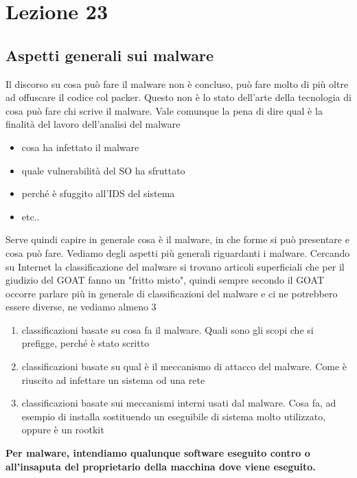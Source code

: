 \documentclass[12pt, oneside]{extbook}
\begin{document}
\chapter{Lezione 23}
\section{Aspetti generali sui malware}
Il discorso su cosa può fare il malware non è concluso, può fare molto di più oltre ad offuscare il codice col packer. Questo non è lo stato dell'arte della tecnologia di cosa può fare chi scrive il malware. Vale comunque la pena di dire qual è la finalità del lavoro dell'analisi del malware
\begin{itemize}
\item cosa ha infettato il malware
\item quale vulnerabilità del SO ha sfruttato
\item perché è sfuggito all'IDS del sistema\
\item etc..
\end{itemize}
Serve quindi capire in generale cosa è il malware, in che forme si può presentare e cosa può fare. Vediamo degli aspetti più generali riguardanti i malware.
Cercando su Internet la classificazione del malware si trovano articoli superficiali che per il giudizio del GOAT fanno un "fritto misto", quindi sempre secondo il GOAT occorre parlare più in generale di classificazioni del malware e ci ne potrebbero essere diverse, ne vediamo almeno 3
\begin{enumerate}
\item classificazioni basate su cosa fa il malware. Quali sono gli scopi che si prefigge, perché è stato scritto
\item classificazioni basate su qual è il meccanismo di attacco del malware. Come è riuscito ad infettare un sistema od una rete
\item classificazioni basate sui meccanismi interni usati dal malware. Cosa fa, ad esempio di installa sostituendo un eseguibile di sistema molto utilizzato, oppure è un rootkit
\end{enumerate}
\textbf{Per malware, intendiamo qualunque software eseguito contro o all'insaputa del proprietario della macchina dove viene eseguito.}
\end{document}
